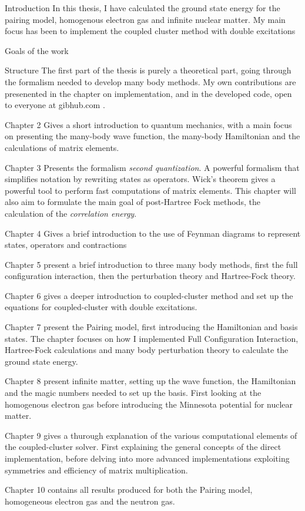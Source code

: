 \documentclass[twoside,english]{uiofysmaster}
\begin{document}
\tableofcontents


\begin{chapter}{Introduction}
	In this thesis, I have calculated the ground state energy for the pairing model, homogenous electron gas and infinite nuclear matter. My main focus has been to implement the coupled cluster method with double excitations 

	\begin{subsection}{Goals of the work}
		
	\end{subsection}

	\begin{subsection}{Structure}
		The first part of the thesis is purely a theoretical part, going through the formalism needed to develop many body methods. My own contributions are presenented in the chapter on implementation, and in the developed code, open to everyone at gibhub.com \cite{WholmenGithub}.

		Chapter 2 Gives a short introduction to quantum mechanics, with a main focus on presenting the many-body wave function, the many-body Hamiltonian and the calculations of matrix elements. 

		Chapter 3 Presents the formalism \textit{second quantization}. A powerful formalism that simplifies notation by rewriting states as operators. Wick's theorem gives a powerful tool to perform fast computations of matrix elements. This chapter will also aim to formulate the main goal of post-Hartree Fock methods, the calculation of the \textit{correlation energy}. 

		Chapter 4 Gives a brief introduction to the use of Feynman diagrams to represent states, operators and contractions

		Chapter 5 present a brief introduction to three many body methods, first the full configuration interaction, then the perturbation theory and Hartree-Fock theory. 

		Chapter 6 gives a deeper introduction to coupled-cluster method and set up the equations for coupled-cluster with double excitations. 

		Chapter 7 present the Pairing model, first introducing the Hamiltonian and basis states. The chapter focuses on how I implemented Full Configuration Interaction, Hartree-Fock calculations and many body perturbation theory to calculate the ground state energy. 

		Chapter 8 present infinite matter, setting up the wave function, the Hamiltonian and the magic numbers needed to set up the basis. First looking at the homogenous electron gas before introducing the Minnesota potential for nuclear matter. 

		Chapter 9 gives a thurough explanation of the various computational elements of the coupled-cluster solver. First explaining the general concepts of the direct implementation, before delving into more advanced implementations exploiting symmetries and efficiency of matrix multiplication. 

		Chapter 10 contains all results produced for both the Pairing model, homogeneous electron gas and the neutron gas. 
	\end{subsection}
\end{chapter}
\end{document}
